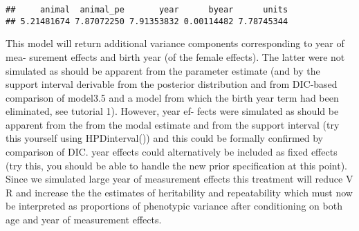 \documentclass[12pt,]{book}
\newenvironment{Shaded}{\begin{snugshade}}{\end{snugshade}}
\newcommand{\DataTypeTok}[1]{\textcolor[rgb]{0.13,0.29,0.53}{#1}}
\newcommand{\DecValTok}[1]{\textcolor[rgb]{0.00,0.00,0.81}{#1}}
\newcommand{\FloatTok}[1]{\textcolor[rgb]{0.00,0.00,0.81}{#1}}
\newcommand{\KeywordTok}[1]{\textcolor[rgb]{0.13,0.29,0.53}{\textbf{#1}}}
\newcommand{\NormalTok}[1]{#1}
\newcommand{\OperatorTok}[1]{\textcolor[rgb]{0.81,0.36,0.00}{\textbf{#1}}}
\newcommand{\OtherTok}[1]{\textcolor[rgb]{0.56,0.35,0.01}{#1}}
\newcommand{\StringTok}[1]{\textcolor[rgb]{0.31,0.60,0.02}{#1}}
\begin{document}
\begin{Shaded}
\end{Shaded}

\begin{verbatim}
##     animal  animal_pe       year      byear      units 
## 5.21481674 7.87072250 7.91353832 0.00114482 7.78745344
\end{verbatim}

This model will return additional variance components corresponding to year of mea- surement effects and birth year (of the female effects). The latter were not simulated as should be apparent from the parameter estimate (and by the support interval derivable from the posterior distribution and from DIC-based comparison of model3.5 and a model from which the birth year term had been eliminated, see tutorial 1). However, year ef- fects were simulated as should be apparent from the from the modal estimate and from the support interval (try this yourself using HPDinterval()) and this could be formally confirmed by comparison of DIC. year effects could alternatively be included as fixed effects (try this, you should be able to handle the new prior specification at this point). Since we simulated large year of measurement effects this treatment will reduce V R and increase the the estimates of heritability and repeatability which must now be interpreted as proportions of phenotypic variance after conditioning on both age and year of measurement effects.
\end{document}
